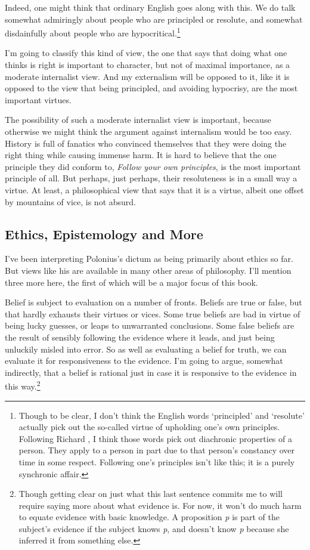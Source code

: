 Indeed, one might think that ordinary English goes along with this. We do talk somewhat admiringly about people who are principled or resolute, and somewhat disdainfully about people who are hypocritical.\footnote{Though to be clear, I don't think the English words `principled' and `resolute' actually pick out the so-called virtue of upholding one's own principles. Following Richard \citet{Holton1999}, I think those words pick out diachronic properties of a person. They apply to a person in part due to that person's constancy over time in some respect. Following one's principles isn't like this; it is a purely synchronic affair.}

I'm going to classify this kind of view, the one that says that doing what one thinks is right is important to character, but not of maximal importance, as a moderate internalist view. And my externalism will be opposed to it, like it is opposed to the view that being principled, and avoiding hypocrisy, are the most important virtues.

The possibility of such a moderate internalist view is important, because otherwise we might think the argument against internalism would be too easy. History is full of fanatics who convinced themselves that they were doing the right thing while causing immense harm. It is hard to believe that the one principle they did conform to, \emph{Follow your own principles}, is the most important principle of all. But perhaps, just perhaps, their resoluteness is in a small way a virtue. At least, a philosophical view that says that it is a virtue, albeit one offset by mountains of vice, is not absurd.

\subsection{Ethics, Epistemology and More}
\label{ethicsepistemologyandmore}

I've been interpreting Polonius's dictum as being primarily about ethics so far. But views like his are available in many other areas of philosophy. I'll mention three more here, the first of which will be a major focus of this book.

Belief is subject to evaluation on a number of fronts. Beliefs are true or false, but that hardly exhausts their virtues or vices. Some true beliefs are bad in virtue of being lucky guesses, or leaps to unwarranted conclusions. Some false beliefs are the result of sensibly following the evidence where it leads, and just being unluckily misled into error. So as well as evaluating a belief for truth, we can evaluate it for responsiveness to the evidence. I'm going to argue, somewhat indirectly, that a belief is rational just in case it is responsive to the evidence in this way.\footnote{Though getting clear on just what this last sentence commits me to will require saying more about what evidence is. For now, it won't do much harm to equate evidence with basic knowledge. A proposition \emph{p} is part of the subject's evidence if the subject knows \emph{p}, and doesn't know \emph{p} because she inferred it from something else.}

